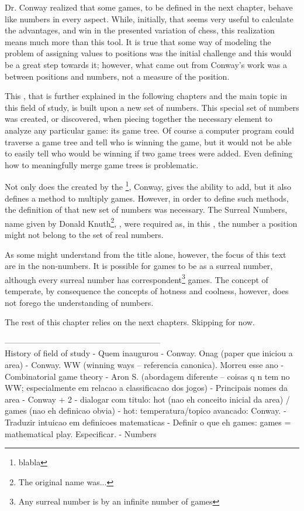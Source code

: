 Dr. Conway realized that some games, to be defined in the next chapter, behave like numbers in every aspect. While, initially, that seems very useful to calculate the advantages, and win in the presented variation of chess, this realization means much more than this tool. It is true that some way of modeling the problem of assigning values to positions was the initial challenge and this would be a great step towards it; however, what came out from Conway's work was a  between positions and numbers, not a measure of the position.

This , that is further explained in the following chapters and the main topic in this field of study, is built upon a new set of numbers. This special set of numbers was created, or discovered, when piecing together the necessary element to analyze any particular game: its game tree. Of course a computer program could traverse a game tree and tell who is winning the game, but it would not be able to easily tell who would be winning if two game trees were added.  Even defining how to meaningfully merge game trees is problematic.

Not only does the  created by the \footnote{blabla}, Conway, gives the ability to add, but it also defines a method to multiply games. However, in order to define such methods, the definition of that new set of numbers was necessary. The Surreal Numbers, name given by Donald Knuth\footnote{The original name was...}, , were required as, in this , the number  a position might not belong to the set of real numbers.

As some might understand from the title alone, however, the focus of this text are in the non-numbers. It is possible for games to be  as a surreal number, although every surreal number has correspondent\footnote{Any surreal number is  by an infinite number of games} games. The concept of temperate, by consequence the concepts of hotness and coolness, however, does not forego the understanding of numbers.

The rest of this chapter relies on the next chapters. Skipping for now.

---------------------------------------------------------\\
History of field of study
- Quem inaugurou
-  Conway. Onag (paper que iniciou a area)
- Conway. WW (winning ways – referencia canonica). Morreu esse ano
- Combinatorial game theory
- Aron S. (abordagem diferente – coisas q n  tem no WW; especialmente em relacao a classificacao dos jogos)
- Principais nomes da area
- Conway + 2 
- dialogar com titulo: hot (nao eh conceito inicial da area) / games (nao eh definicao obvia)
- hot: temperatura/topico avancado: Conway.
- Traduzir intuicao em definicoes matematicas
- Definir o que eh games: games = mathematical play. Especificar.
- Numbers

